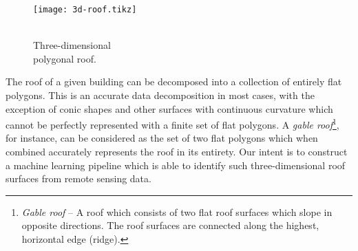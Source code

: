 \begin{wrapfigure}[10]{r}{0.25\textwidth}
  \vspace{-2em}
  \begin{center}
    \texttt{[image: 3d-roof.tikz]}
  \end{center}
  \caption{%
    \\
    Three-dimensional\\polygonal roof.
  }%
  \label{fig:gable-roof}
\end{wrapfigure}

The roof of a given building can be decomposed into a collection of entirely flat polygons.
This is an accurate data decomposition in most cases, with the exception of conic shapes and other surfaces with continuous curvature which cannot be perfectly represented with a finite set of flat polygons.
A \emph{gable roof}\footnote{\textit{Gable roof} -- A roof which consists of two flat roof surfaces which slope in opposite directions. The roof surfaces are connected along the highest, horizontal edge (ridge).}, for instance, can be considered as the set of two flat polygons which when combined accurately represents the roof in its entirety.
Our intent is to construct a machine learning pipeline which is able to identify such three-dimensional roof surfaces from remote sensing data.

